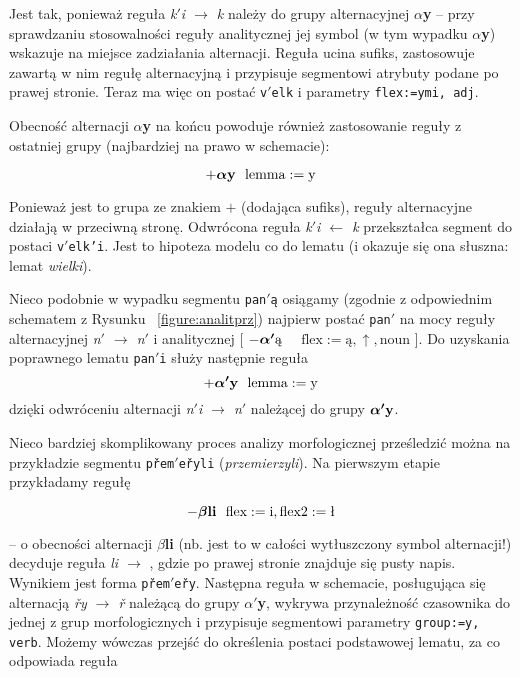 \documentclass{article}
\begin{document}
Jest tak, ponieważ reguła \textit{k$'$i $\rightarrow$ k} należy do grupy alternacyjnej \boldmath$\alpha${\bf y}
-- przy sprawdzaniu stosowalności reguły analitycznej jej symbol (w tym wypadku \boldmath$\alpha${\bf y}) wskazuje na miejsce zadziałania alternacji.
Reguła ucina sufiks, zastosowuje zawartą w nim regułę alternacyjną i przypisuje segmentowi atrybuty podane po prawej stronie.
Teraz ma więc on postać \texttt{v$'$elk} i parametry \texttt{flex:=ymi, adj}.

Obecność alternacji \boldmath$\alpha${\bf y} na końcu powoduje również zastosowanie reguły z ostatniej grupy (najbardziej na prawo w schemacie):

\[
+\text{\boldmath$\alpha${\bf y}} \>\>\> \text{lemma}:=\text{y}
\]

Ponieważ jest to grupa ze znakiem $+$ (dodająca sufiks), reguły alternacyjne działają w przeciwną stronę.
Odwrócona reguła \textit{k$'$i $\leftarrow$ k} przekształca segment do postaci \texttt{v$'$elk'i}.
Jest to hipoteza modelu co do lematu (i okazuje się ona słuszna: lemat \textit{wielki}).

Nieco podobnie w wypadku segmentu \texttt{pan$'$ą} osiągamy (zgodnie z odpowiednim schematem z Rysunku ~\ref{figure:analitprz})
najpierw postać \texttt{pan$'$} na mocy reguły alternacyjnej \textit{n$'$ $\rightarrow$ n$'$}
   i analitycznej
	[ $-\text{\boldmath$\alpha'$ą}$ $\>\>\>$ $\text{flex}:=\text{ą}, \uparrow, \text{noun}$ ].
Do uzyskania poprawnego lematu \texttt{pan$'$i} służy następnie reguła
\[
	+\text{\boldmath$\alpha'${\bf y}} \>\>\> \text{lemma}:=\text{y}
	\]
	dzięki odwróceniu alternacji \textit{n$'$i $\rightarrow$ n$'$} należącej do grupy $\text{\boldmath$\alpha'${\bf y}}$.

Nieco bardziej skomplikowany proces analizy morfologicznej prześledzić można na przykładzie segmentu \texttt{přem$'$eřyli} (\textit{przemierzyli}). Na pierwszym etapie przykładamy regułę 

\[
-\text{\boldmath$\beta${\bf li}} \>\>\> \text{flex}:=\text{i}, \text{flex2}:=\text{ł}
  \]

  -- o obecności alternacji \textbf{$\beta${\bf li}} (nb. jest to w całości wytłuszczony symbol alternacji!) decyduje reguła \textit{li $\rightarrow$ }, gdzie po prawej stronie znajduje się pusty napis. Wynikiem jest forma \texttt{přem$'$eřy}.
  Następna reguła w schemacie, posługująca się alternacją \textit{řy $\rightarrow$ ř} należącą do grupy $\alpha'${\bf y},
  wykrywa przynależność czasownika do jednej z grup morfologicznych i przypisuje segmentowi parametry \texttt{group:=y, verb}. Możemy wówczas przejść do określenia postaci podstawowej lematu, za co odpowiada reguła
\end{document}

